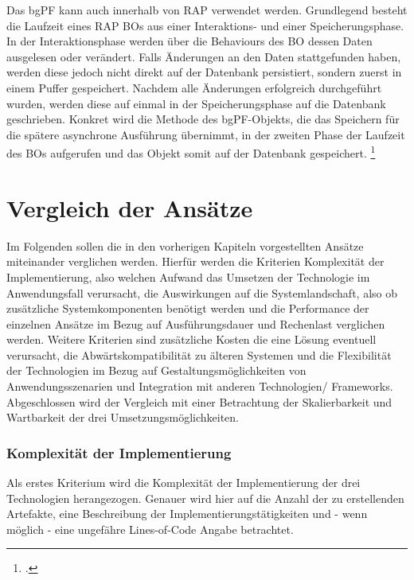 Das bgPF kann auch innerhalb von RAP verwendet werden. Grundlegend besteht die Laufzeit eines RAP BOs aus einer Interaktions- und einer Speicherungsphase. In der Interaktionsphase werden über die Behaviours des BO dessen Daten ausgelesen oder verändert. Falls Änderungen an den Daten stattgefunden haben, werden diese jedoch nicht direkt auf der Datenbank persistiert, sondern zuerst in einem Puffer gespeichert. Nachdem alle Änderungen erfolgreich durchgeführt wurden, werden diese auf einmal in der Speicherungsphase auf die Datenbank geschrieben. Konkret wird die Methode des bgPF-Objekts, die das Speichern für die spätere asynchrone Ausführung übernimmt, in der zweiten Phase der Laufzeit des BOs aufgerufen und das Objekt somit auf der Datenbank gespeichert. \footcite[Vgl.][]{sap_bgpf_2023}

\section{Vergleich der Ansätze}

Im Folgenden sollen die in den vorherigen Kapiteln vorgestellten Ansätze miteinander verglichen werden. Hierfür werden die Kriterien Komplexität der Implementierung, also welchen Aufwand das Umsetzen der Technologie im Anwendungsfall verursacht, die Auswirkungen auf die Systemlandschaft, also ob zusätzliche Systemkomponenten benötigt werden und die Performance der einzelnen Ansätze im Bezug auf Ausführungsdauer und Rechenlast verglichen werden. Weitere Kriterien sind zusätzliche Kosten die eine Lösung eventuell verursacht, die Abwärtskompatibilität zu älteren Systemen und die Flexibilität der Technologien im Bezug auf Gestaltungsmöglichkeiten von Anwendungsszenarien und Integration mit anderen Technologien/ Frameworks. Abgeschlossen wird der Vergleich mit einer Betrachtung der Skalierbarkeit und Wartbarkeit der drei Umsetzungsmöglichkeiten.

\subsubsection{Komplexität der Implementierung}

Als erstes Kriterium wird die Komplexität der Implementierung der drei Technologien herangezogen. Genauer wird hier auf die Anzahl der zu erstellenden Artefakte, eine Beschreibung der Implementierungstätigkeiten und - wenn möglich - eine ungefähre Lines-of-Code Angabe betrachtet.

